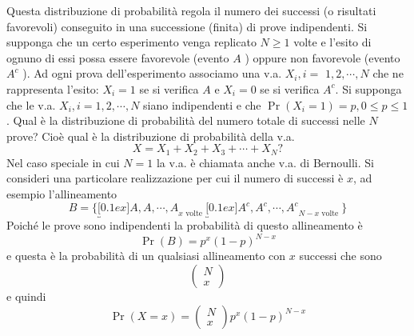 Questa distribuzione di probabilità regola il numero dei successi (o risultati favorevoli) conseguito in una successione (finita) di prove indipendenti.
Si supponga che un certo esperimento venga replicato $N \geq 1$ volte e l'esito di ognuno di essi possa essere favorevole (evento $A$ ) oppure non favorevole (evento $A^c$ ). Ad ogni prova dell'esperimento associamo una v.a. $X_i, i=$ $1,2, \cdots, N$ che ne rappresenta l'esito: $X_i=1$ se si verifica $A$ e $X_i=0$ se si verifica $A^c$. Si supponga che le v.a. $X_i, i=1,2, \cdots, N$ siano indipendenti e che $\Pr\left(X_i=1\right)=p, 0 \leq p \leq 1$. Qual è la distribuzione di probabilità del numero totale di successi nelle $N$ prove? Cioè qual è la distribuzione di probabilità della v.a.
\[
	X=X_1+X_2+X_3+\cdots+X_N ?
\]
Nel caso speciale in cui $N=1$ la v.a. è chiamata anche v.a. di Bernoulli.
Si consideri una particolare realizzazione per cui il numero di successi è $x$, ad esempio l'allineamento
\[
  B=\{\underbracket[0.1ex]{A, A, \cdots, A}_{x \text { volte }} \underbracket[0.1ex]{A^c, A^c, \cdots, A^c}_{N-x \text { volte }}\}
\]
Poiché le prove sono indipendenti la probabilità di questo allineamento è
\[
	\Pr(B)=p^x(1-p)^{N-x}
\]
e questa è la probabilità di un qualsiasi allineamento con $x$ successi che sono
\[
	\left(\begin{array}{l}
			N \\
			x
		\end{array}\right)
\]
e quindi
\[
	\Pr(X=x)=\left(\begin{array}{l}
			N \\
			x
		\end{array}\right) p^x(1-p)^{N-x}
\]
